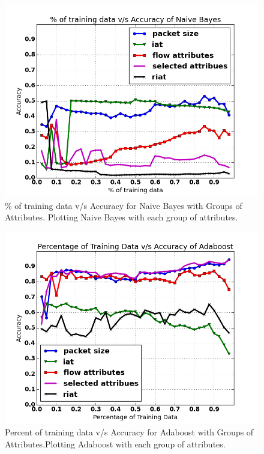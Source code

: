 \documentclass[conference]{IEEEtran}
\begin{document}
\begin{figure}[!t]
	\centering
	\includegraphics[width=1\columnwidth]{naive_bayes_all_attr_plot.png}
	\caption{\% of training data v/s Accuracy for Naive Bayes with Groups of Attributes. Plotting Naive Bayes with each group of attributes.}
	\label{fig:naive_attributes}
\end{figure}
\begin{figure}[!t]
	\centering
	\includegraphics[width=1\columnwidth]{adaboost_all_attr_plot.png}
	\caption{Percent of training data v/s Accuracy for Adaboost with Groups of Attributes.Plotting Adaboost with each group of attributes.}
	\label{fig:adaboost_attributes}
\end{figure}
\end{document}
